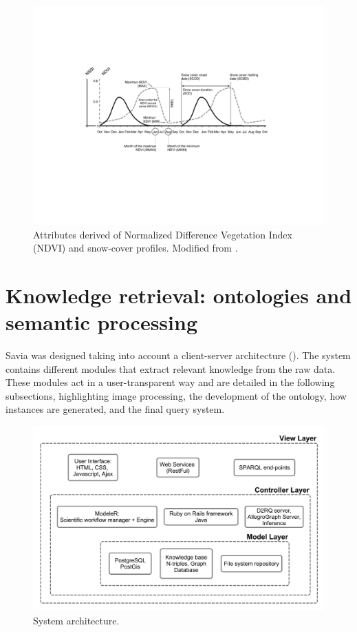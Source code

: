 \begin{figure}
    \centering
    \includegraphics[width=\textwidth]{img/onto/onto-figure-indicators}\caption{Attributes derived of Normalized Difference Vegetation Index (NDVI) and snow-cover profiles. Modified from \autocite{AlcarazSeguraetal2009BaselineCharacterization,WangXie2009NewMethods}.}\label{fig:onto:indicator}
\end{figure}

\section{Knowledge retrieval: ontologies and semantic processing}\label{sec:onto:Semantic}

Savia was designed taking into account a client-server architecture (). The system contains different modules that extract relevant knowledge from the raw data. These modules act in a user-transparent way and are detailed in the following subsections, highlighting image processing, the development of the ontology, how instances are generated, and the final query system.

\begin{figure}
    \centering
    \includegraphics[width=\textwidth]{img/onto/onto-architecture}\caption{System architecture.}\label{fig:onto:architecture}
\end{figure}


